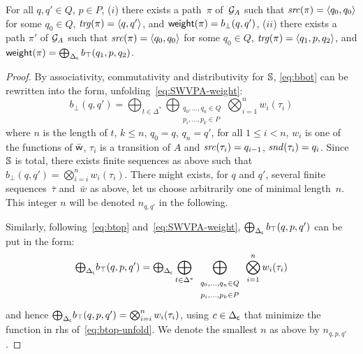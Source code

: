 \begin{lemma}[Completeness] \label{lem:algo-completeness}
For all $q, q' \in Q$, $p\in P$, 
($i$) there exists a path~$\pi$ of~$\mathcal{G}_A$ 
such that $\src(\pi) = \<q_0, q_0>$ for some $q_0 \in Q$, 
$\trg(\pi) = \< q, q'>$,
and $\mathsf{weight}(\pi) = b_\bot(q, q')$, 
($ii$) there exists a path $\pi'$ of $\mathcal{G}_A$ 
such that $\src(\pi) = \<q_0, q_0>$ for some $q_0 \in Q$, 
$\trg(\pi) = \< q_1, p, q_2>$,
and $\mathsf{weight}(\pi) = \bigoplus_{\Delta_\mathsf{c}} b_\top(q_1, p, q_2)$.
\end{lemma}
%
\begin{proof}
By associativity, commutativity and distributivity for $\mathbb{S}$,
\eqref{eq:bbot} can be rewritten into the form, unfolding~\eqref{eq:SWVPA-weight}:
%
\begin{equation}\label{eq:bbot-unfold}
b_\bot(q, q') = 
\bigoplus_{t\in \Delta^*} 
\bigoplus_{\begin{array}{c}
           \scriptstyle q_0,\ldots, q_n \in Q\\
           \scriptstyle p_{i},\ldots, p_{k} \in P
           \end{array}}
\bigotimes_{i=1}^n w_i(\tau_i)           
\end{equation}
%
where $n$ is the length of $t$, $k \leq n$,
$q_0 = q$, $q_n = q'$, 
for all $1 \leq i < n$, 
$w_i$ is one of the functions of $\bar{\mathsf{w}}$,
$\tau_i$ is a transition of $A$ and
$\mathit{src}(\tau_i) = q_{i-1}$, $\mathit{snd}(\tau_i) = q_i$.
%
Since $\mathbb{S}$ is total, there exists finite sequences as above such that
\( b_\bot(q, q') = \bigotimes_{i=i}^n w_i(\tau_i)\).
%
There might exists, for $q$ and $q'$,
several finite sequences~$\bar\tau$ and~$\bar{w}$ as above, 
let us choose arbitrarily one of minimal length~$n$. 
This integer $n$ will be denoted $n_{q, q'}$ in the following.

Similarly, following~\eqref{eq:btop} and~\eqref{eq:SWVPA-weight}, 
$\bigoplus_{\Delta_\mathsf{c}} b_\top(q, p, q')$ can be put in the form:
%
\begin{equation}\label{eq:btop-unfold}
{\textstyle\bigoplus_{\Delta_\mathsf{c}}} b_\top(q, p, q') = 
{\textstyle\bigoplus_{\Delta_\mathsf{c}}} \bigoplus_{t\in \Delta^*} 
\bigoplus_{\begin{array}{c}
           \scriptstyle q_0,\ldots, q_n \in Q\\
           \scriptstyle p_{i},\ldots, p_{k} \in P
           \end{array}}
\bigotimes_{i=1}^n w_i(\tau_i)           
\end{equation}
%
and hence 
\( {\textstyle\bigoplus_{\Delta_\mathsf{c}}} b_\top(q, p, q') = \bigotimes_{i=i}^n w_i(\tau_i) \),
using $c \in {\Delta_\mathsf{c}}$ that minimize the function in rhs of~\eqref{eq:btop-unfold}.
We denote the smallest $n$ as above by $n_{q, p, q'}$.


\end{proof}
